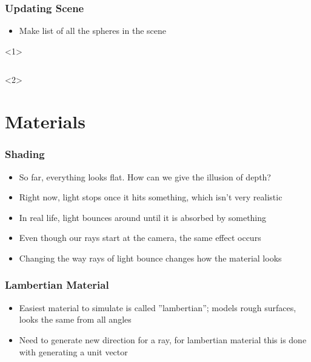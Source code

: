 \documentclass{beamer}
\begin{document}
\begin{frame}[fragile]
	\frametitle{Updating Scene}
	\begin{itemize}
		\item Make list of all the spheres in the scene
	\end{itemize}
	\begin{onlyenv}
		\inputminted{python}{scripts/multipleLoop.py}
	\end{onlyenv}
\end{frame}

\section{Materials}

\begin{frame}
	\frametitle{Shading}
	\begin{itemize}
		\item So far, everything looks flat. How can we give the illusion of depth?
		\item Right now, light stops once it hits something, which isn't very realistic
		\item In real life, light bounces around until it is absorbed by something
		\item Even though our rays start at the camera, the same effect occurs
		\item Changing the way rays of light bounce changes how the material looks
	\end{itemize}
\end{frame}

\begin{frame}[fragile]
	\frametitle{Lambertian Material}
	\begin{itemize}
		\item Easiest material to simulate is called ''lambertian''; models rough surfaces, looks the same from all angles
		\item Need to generate new direction for a ray, for lambertian material this is done with generating a unit vector
	\end{itemize}
	\inputminted{python}{scripts/randSphere.py}
\end{frame}
\end{document}
